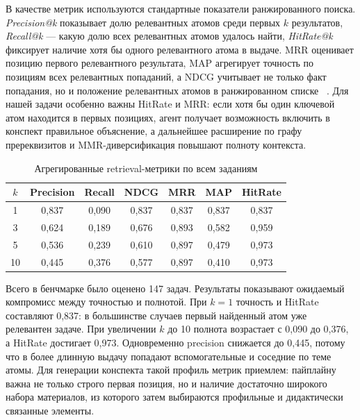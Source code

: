 \documentclass[a4paper,12pt]{extarticle}
\begin{document}
В качестве метрик используются стандартные показатели ранжированного поиска.
\textit{Precision@k} показывает долю релевантных атомов среди первых $k$
результатов, \textit{Recall@k} --- какую долю всех релевантных атомов удалось
найти, \textit{HitRate@k} фиксирует наличие хотя бы одного релевантного атома в
выдаче. MRR оценивает позицию первого релевантного результата, MAP агрегирует
точность по позициям всех релевантных попаданий, а NDCG учитывает не только факт
попадания, но и положение релевантных атомов в ранжированном списке
~\cite{manning2008ir,jarvelin2002cumulated,voorhees1999trec}. Для нашей задачи
особенно важны HitRate и MRR: если хотя бы один ключевой атом находится в первых
позициях, агент получает возможность включить в конспект правильное объяснение,
а дальнейшее расширение по графу пререквизитов и MMR-диверсификация повышают
полноту контекста.

\begin{table}[H]
\caption{Агрегированные retrieval-метрики по всем заданиям}
\label{tab:retrieval_metrics_all}
\centering
\small
\begin{tabular}{@{}c c c c c c c@{}}
\toprule
$k$ & Precision & Recall & NDCG & MRR & MAP & HitRate \\
\midrule
1  & 0,837 & 0,090 & 0,837 & 0,837 & 0,837 & 0,837 \\
3  & 0,624 & 0,189 & 0,676 & 0,893 & 0,582 & 0,959 \\
5  & 0,536 & 0,239 & 0,610 & 0,897 & 0,479 & 0,973 \\
10 & 0,445 & 0,376 & 0,577 & 0,897 & 0,410 & 0,973 \\
\bottomrule
\end{tabular}
\end{table}

Всего в бенчмарке было оценено 147 задач. Результаты показывают ожидаемый
компромисс между точностью и полнотой. При $k = 1$ точность и HitRate составляют
0,837: в большинстве случаев первый найденный атом уже релевантен задаче.
При увеличении $k$ до 10 полнота возрастает с 0,090 до 0,376, а HitRate достигает
0,973. Одновременно precision снижается до 0,445, потому что в более длинную
выдачу попадают вспомогательные и соседние по теме атомы. Для генерации
конспекта такой профиль метрик приемлем: пайплайну важна не только строго
первая позиция, но и наличие достаточно широкого набора материалов, из которого
затем выбираются профильные и дидактически связанные элементы.
\end{document}
